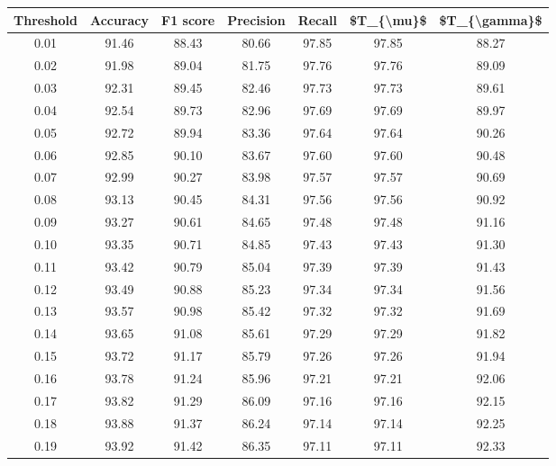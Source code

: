 \begin{tabular}{|c|c|c|c|c|c|c|}
\hline
 Threshold &  Accuracy &  F1 score &  Precision &  Recall &  \$T\_\{\textbackslash mu\}\$ &  \$T\_\{\textbackslash gamma\}\$ \\
\hline
      0.01 &     91.46 &     88.43 &      80.66 &   97.85 &      97.85 &         88.27 \\
      0.02 &     91.98 &     89.04 &      81.75 &   97.76 &      97.76 &         89.09 \\
      0.03 &     92.31 &     89.45 &      82.46 &   97.73 &      97.73 &         89.61 \\
      0.04 &     92.54 &     89.73 &      82.96 &   97.69 &      97.69 &         89.97 \\
      0.05 &     92.72 &     89.94 &      83.36 &   97.64 &      97.64 &         90.26 \\
      0.06 &     92.85 &     90.10 &      83.67 &   97.60 &      97.60 &         90.48 \\
      0.07 &     92.99 &     90.27 &      83.98 &   97.57 &      97.57 &         90.69 \\
      0.08 &     93.13 &     90.45 &      84.31 &   97.56 &      97.56 &         90.92 \\
      0.09 &     93.27 &     90.61 &      84.65 &   97.48 &      97.48 &         91.16 \\
      0.10 &     93.35 &     90.71 &      84.85 &   97.43 &      97.43 &         91.30 \\
      0.11 &     93.42 &     90.79 &      85.04 &   97.39 &      97.39 &         91.43 \\
      0.12 &     93.49 &     90.88 &      85.23 &   97.34 &      97.34 &         91.56 \\
      0.13 &     93.57 &     90.98 &      85.42 &   97.32 &      97.32 &         91.69 \\
      0.14 &     93.65 &     91.08 &      85.61 &   97.29 &      97.29 &         91.82 \\
      0.15 &     93.72 &     91.17 &      85.79 &   97.26 &      97.26 &         91.94 \\
      0.16 &     93.78 &     91.24 &      85.96 &   97.21 &      97.21 &         92.06 \\
      0.17 &     93.82 &     91.29 &      86.09 &   97.16 &      97.16 &         92.15 \\
      0.18 &     93.88 &     91.37 &      86.24 &   97.14 &      97.14 &         92.25 \\
      0.19 &     93.92 &     91.42 &      86.35 &   97.11 &      97.11 &         92.33 \\

\end{tabular}
